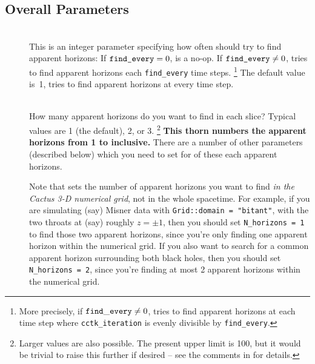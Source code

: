 
\subsection{Overall Parameters}
\label{AHFinderDirect/sect-parameters/overall-parameters}

\begin{description}
\item[]
\mbox{}\\
	This is an integer parameter specifying how often
	 should try to find apparent horizons:
	If $\verb|find_every| = 0$,  is a no-op.
	If $\verb|find_every| \ne 0$,  tries to
	find apparent horizons each \verb|find_every| time steps.%
\footnote{%
	 More precisely, if ${\tt find\_every} \ne 0$,
	  tries to find apparent
	 horizons at each time step where {\tt cctk\_iteration}
	 is evenly divisible by {\tt find\_every}.
	 }%
{}	The default value is~1, \ie{}  tries
	to find apparent horizons at every time step.
\item[]
\mbox{}\\
	How many apparent horizons do you want to find in each slice?
	Typical values are 1 (the default), 2, or 3.%
\footnote{%
	 Larger values are also possible.  The present upper
	 limit is 100, but it would be trivial to raise this
	 further if desired -- see the comments in 
	 for details.
	 }%
{}	{\bf This thorn numbers the apparent horizons from 1 to
	 inclusive.}
	There are a number of other parameters (described below)
	which you need to set for of these each apparent horizons.

	Note that  sets the number of apparent horizons
	you want to find {\em in the Cactus 3-D numerical grid\/}, not in
	the whole spacetime.  For example, if you are simulating (say)
	Misner data with \verb|Grid::domain = "bitant"|, with the two
	throats at (say) roughly $z = \pm 1$, then you should set
	\verb|N_horizons = 1| to find those two apparent horizons,
	since you're only finding one apparent horizon within the
	numerical grid.  If you also want to search for a common
	apparent horizon surrounding both black holes, then you should
	set \verb|N_horizons = 2|, since you're finding at most 2
	apparent horizons within the numerical grid.


\end{description}
